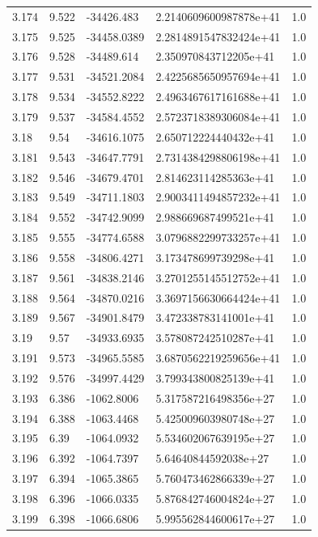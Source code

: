 \begin{tabular}{lllll}
3.174 & 9.522 & -34426.483 & 2.2140609600987878e+41 & 1.0 \\
3.175 & 9.525 & -34458.0389 & 2.2814891547832424e+41 & 1.0 \\
3.176 & 9.528 & -34489.614 & 2.350970843712205e+41 & 1.0 \\
3.177 & 9.531 & -34521.2084 & 2.4225685650957694e+41 & 1.0 \\
3.178 & 9.534 & -34552.8222 & 2.4963467617161688e+41 & 1.0 \\
3.179 & 9.537 & -34584.4552 & 2.5723718389306084e+41 & 1.0 \\
3.18 & 9.54 & -34616.1075 & 2.650712224440432e+41 & 1.0 \\
3.181 & 9.543 & -34647.7791 & 2.7314384298806198e+41 & 1.0 \\
3.182 & 9.546 & -34679.4701 & 2.814623114285363e+41 & 1.0 \\
3.183 & 9.549 & -34711.1803 & 2.9003411494857232e+41 & 1.0 \\
3.184 & 9.552 & -34742.9099 & 2.988669687499521e+41 & 1.0 \\
3.185 & 9.555 & -34774.6588 & 3.0796882299733257e+41 & 1.0 \\
3.186 & 9.558 & -34806.4271 & 3.173478699739298e+41 & 1.0 \\
3.187 & 9.561 & -34838.2146 & 3.2701255145512752e+41 & 1.0 \\
3.188 & 9.564 & -34870.0216 & 3.3697156630664424e+41 & 1.0 \\
3.189 & 9.567 & -34901.8479 & 3.472338783141001e+41 & 1.0 \\
3.19 & 9.57 & -34933.6935 & 3.578087242510287e+41 & 1.0 \\
3.191 & 9.573 & -34965.5585 & 3.6870562219259656e+41 & 1.0 \\
3.192 & 9.576 & -34997.4429 & 3.799343800825139e+41 & 1.0 \\
3.193 & 6.386 & -1062.8006 & 5.317587216498356e+27 & 1.0 \\
3.194 & 6.388 & -1063.4468 & 5.425009603980748e+27 & 1.0 \\
3.195 & 6.39 & -1064.0932 & 5.534602067639195e+27 & 1.0 \\
3.196 & 6.392 & -1064.7397 & 5.64640844592038e+27 & 1.0 \\
3.197 & 6.394 & -1065.3865 & 5.760473462866339e+27 & 1.0 \\
3.198 & 6.396 & -1066.0335 & 5.876842746004824e+27 & 1.0 \\
3.199 & 6.398 & -1066.6806 & 5.995562844600617e+27 & 1.0 \\

\end{tabular}
